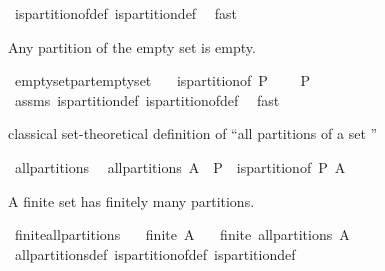 \begin{isabellebody}
\isamarkupfalse%
\ is{\isacharunderscore}partition{\isacharunderscore}of{\isacharunderscore}def\ is{\isacharunderscore}partition{\isacharunderscore}def\ \isamarkupfalse%
\ fast%
\endisatagproof
{\isafoldproof}%
%
\isadelimproof
%
\endisadelimproof
%
\begin{isamarkuptext}%
Any partition of the empty set is empty.%
\end{isamarkuptext}%
\isamarkuptrue%
\isamarkupfalse%
\ emptyset{\isacharunderscore}part{\isacharunderscore}emptyset{}{\isacharcolon}\isanewline
\ \ \ {\isachardoublequoteopen}is{\isacharunderscore}partition{\isacharunderscore}of\ P\ {\isacharbraceleft}{\isacharbraceright}{\isachardoublequoteclose}\isanewline
\ \ \ {\isachardoublequoteopen}P\ {\isacharequal}\ {\isacharbraceleft}{\isacharbraceright}{\isachardoublequoteclose}\isanewline
%
\isadelimproof
\ \ %
\endisadelimproof
%
\isatagproof
{}\isamarkupfalse%
\ assms\ is{\isacharunderscore}partition{\isacharunderscore}def\ is{\isacharunderscore}partition{\isacharunderscore}of{\isacharunderscore}def\ \isamarkupfalse%
\ fast%
\endisatagproof
{\isafoldproof}%
%
\isadelimproof
%
\endisadelimproof
%
\begin{isamarkuptext}%
classical set-theoretical definition of ``all partitions of a set ''%
\end{isamarkuptext}%
\isamarkuptrue%
\isamarkupfalse%
\ all{\isacharunderscore}partitions\ \ \isanewline
{\isachardoublequoteopen}all{\isacharunderscore}partitions\ A\ {\isacharequal}\ {\isacharbraceleft}P\ {\isachardot}\ is{\isacharunderscore}partition{\isacharunderscore}of\ P\ A{\isacharbraceright}{\isachardoublequoteclose}%
\begin{isamarkuptext}%
A finite set has finitely many partitions.%
\end{isamarkuptext}%
\isamarkuptrue%
\isamarkupfalse%
\ finite{\isacharunderscore}all{\isacharunderscore}partitions{\isacharcolon}\isanewline
\ \ \ {\isachardoublequoteopen}finite\ A{\isachardoublequoteclose}\isanewline
\ \ \ {\isachardoublequoteopen}finite\ {\isacharparenleft}all{\isacharunderscore}partitions\ A{\isacharparenright}{\isachardoublequoteclose}\isanewline
%
\isadelimproof
%
\endisadelimproof
%
\isatagproof
{}\isamarkupfalse%
\ all{\isacharunderscore}partitions{\isacharunderscore}def\ is{\isacharunderscore}partition{\isacharunderscore}of{\isacharunderscore}def\ is{\isacharunderscore}partition{\isacharunderscore}def\isanewline

\end{isabellebody}
